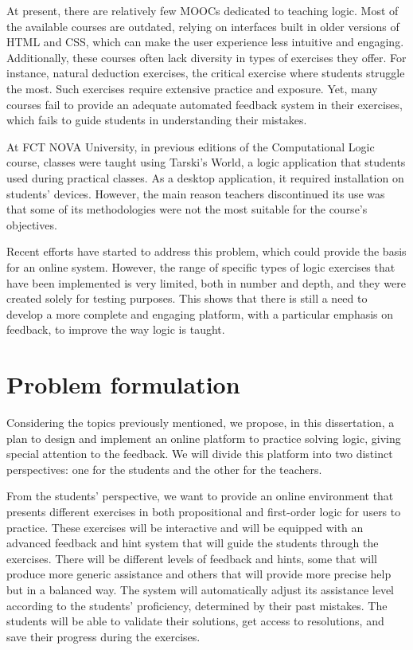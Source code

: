 At present, there are relatively few MOOCs dedicated to teaching logic. Most of the available courses are outdated, relying on interfaces built in older versions of HTML and CSS, which can make the user experience less intuitive and engaging. Additionally, these courses often lack diversity in types of exercises they offer. For instance, natural deduction exercises, the critical exercise where students struggle the most. Such exercises require extensive practice and exposure. Yet, many courses fail to provide an adequate automated feedback system in their exercises, which fails to guide students in understanding their mistakes.

At FCT NOVA University, in previous editions of the Computational Logic course, classes were taught using Tarski's World, a logic application that students used during practical classes. As a desktop application, it required installation on students' devices. However, the main reason teachers discontinued its use was that some of its methodologies were not the most suitable for the course's objectives. 

Recent efforts have started to address this problem, which could provide the basis for an online system. However, the range of specific types of logic exercises that have been implemented is very limited, both in number and depth, and they were created solely for testing purposes. This shows that there is still a need to develop a more complete and engaging platform, with a particular emphasis on feedback, to improve the way logic is taught.

\section{Problem formulation}
Considering the topics previously mentioned, we propose, in this dissertation, a plan to design and implement an online platform to practice solving logic, giving special attention to the feedback. We will divide this platform into two distinct perspectives: one for the students and the other for the teachers.

From the students' perspective, we want to provide an online environment that presents different exercises in both propositional and first-order logic for users to practice. These exercises will be interactive and will be equipped with an advanced feedback and hint system that will guide the students through the exercises. There will be different levels of feedback and hints, some that will produce more generic assistance and others that will provide more precise help but in a balanced way. The system will automatically adjust its assistance level according to the students' proficiency, determined by their past mistakes. The students will be able to validate their solutions, get access to resolutions, and save their progress during the exercises.


